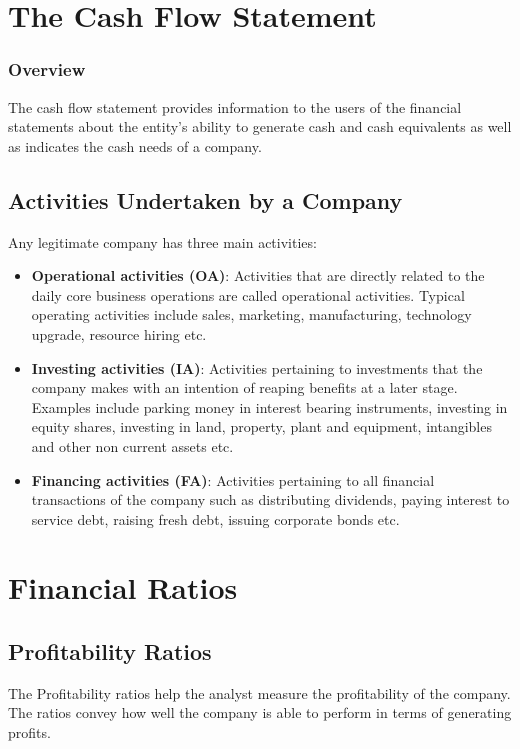 \section{The Cash Flow Statement}
\subsubsection{Overview}
The cash flow statement provides information to the users of the financial statements about the entity’s ability to generate cash and cash equivalents as well as indicates the cash needs of a company.

\subsection{Activities Undertaken by a Company}
Any legitimate company has three main activities:
\begin{itemize}
  \item \textbf{Operational activities (OA)}: Activities that are directly related to the daily core business operations are called operational activities. Typical operating activities include sales, marketing, manufacturing, technology upgrade, resource hiring etc.
  \item \textbf{Investing activities (IA)}: Activities pertaining to investments that the company makes with an intention of reaping benefits at a later stage. Examples include parking money in interest bearing instruments, investing in equity shares, investing in land, property, plant and equipment, intangibles and other non current assets etc.
  \item \textbf{Financing activities (FA)}: Activities pertaining to all financial transactions of the company such as distributing dividends, paying interest to service debt, raising fresh debt, issuing corporate bonds etc.
\end{itemize}

\section{Financial Ratios}

\subsection{Profitability Ratios}
The Profitability ratios help the analyst measure the profitability of the company. The ratios convey how well the company is able to perform in terms of generating profits.

